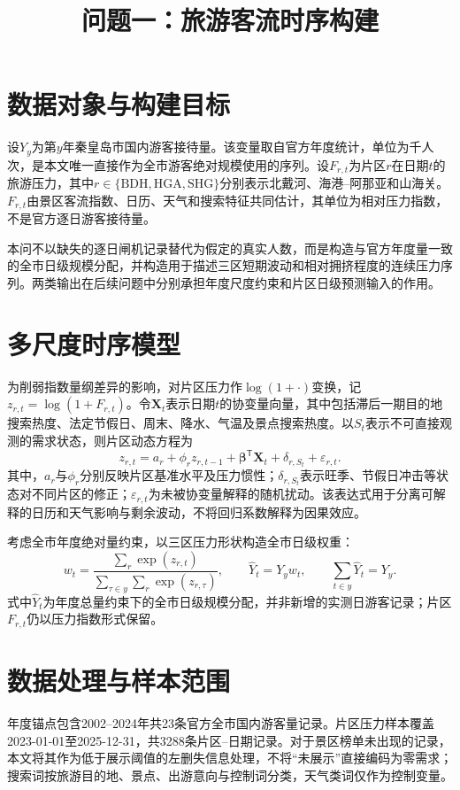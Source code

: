 \documentclass[UTF8,12pt,a4paper]{ctexart}
\title{问题一：旅游客流时序构建}
\author{}
\date{}
\begin{document}
\maketitle

\section{数据对象与构建目标}
设$Y_y$为第$y$年秦皇岛市国内游客接待量。该变量取自官方年度统计，单位为千人次，是本文唯一直接作为全市游客绝对规模使用的序列。设$F_{r,t}$为片区$r$在日期$t$的旅游压力，其中$r\in\{\mathrm{BDH,HGA,SHG}\}$分别表示北戴河、海港--阿那亚和山海关。$F_{r,t}$由景区客流指数、日历、天气和搜索特征共同估计，其单位为相对压力指数，不是官方逐日游客接待量。

本问不以缺失的逐日闸机记录替代为假定的真实人数，而是构造与官方年度量一致的全市日级规模分配，并构造用于描述三区短期波动和相对拥挤程度的连续压力序列。两类输出在后续问题中分别承担年度尺度约束和片区日级预测输入的作用。

\section{多尺度时序模型}
为削弱指数量纲差异的影响，对片区压力作$\log(1+\cdot)$变换，记$z_{r,t}=\log(1+F_{r,t})$。令$\mathbf X_t$表示日期$t$的协变量向量，其中包括滞后一期目的地搜索热度、法定节假日、周末、降水、气温及景点搜索热度。以$S_t$表示不可直接观测的需求状态，则片区动态方程为
\begin{equation}
z_{r,t}=a_r+\phi_rz_{r,t-1}+\boldsymbol\beta^{\mathsf T}\mathbf X_t+\delta_{r,S_t}+\varepsilon_{r,t}.
\end{equation}
其中，$a_r$与$\phi_r$分别反映片区基准水平及压力惯性；$\delta_{r,S_t}$表示旺季、节假日冲击等状态对不同片区的修正；$\varepsilon_{r,t}$为未被协变量解释的随机扰动。该表达式用于分离可解释的日历和天气影响与剩余波动，不将回归系数解释为因果效应。

考虑全市年度绝对量约束，以三区压力形状构造全市日级权重：
\begin{equation}
w_t=\frac{\sum_r\exp(z_{r,t})}{\sum_{\tau\in y}\sum_r\exp(z_{r,\tau})},\qquad
\widehat Y_t=Y_yw_t,\qquad \sum_{t\in y}\widehat Y_t=Y_y.
\end{equation}
式中$\widehat Y_t$为年度总量约束下的全市日级规模分配，并非新增的实测日游客记录；片区$F_{r,t}$仍以压力指数形式保留。

\section{数据处理与样本范围}
年度锚点包含2002--2024年共23条官方全市国内游客量记录。片区压力样本覆盖2023-01-01至2025-12-31，共3288条片区--日期记录。对于景区榜单未出现的记录，本文将其作为低于展示阈值的左删失信息处理，不将``未展示''直接编码为零需求；搜索词按旅游目的地、景点、出游意向与控制词分类，天气类词仅作为控制变量。
\end{document}
